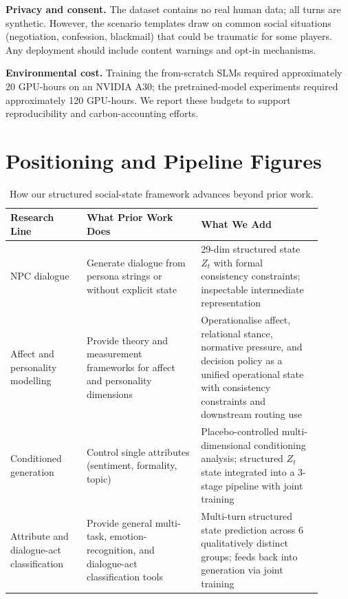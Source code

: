 \documentclass[11pt]{article}
\begin{document}
\textbf{Privacy and consent.} The dataset contains no real human data; all turns are synthetic.
However, the scenario templates draw on common social situations (negotiation, confession, blackmail) that could be traumatic for some players.
Any deployment should include content warnings and opt-in mechanisms.

\textbf{Environmental cost.} Training the from-scratch SLMs required approximately 20 GPU-hours on an NVIDIA A30; the pretrained-model experiments required approximately 120 GPU-hours.
We report these budgets to support reproducibility and carbon-accounting efforts.



\appendix

\section{Positioning and Pipeline Figures}
\label{app:positioning}

\begin{table}[tp]
\centering
\caption{How our structured social-state framework advances beyond prior work.}
\label{tab:novelty}
\footnotesize\setlength{\tabcolsep}{2pt}
\begin{tabular}{@{}p{0.22\linewidth}p{0.33\linewidth}p{0.35\linewidth}@{}}
\toprule
\textbf{Research Line} & \textbf{What Prior Work Does} & \textbf{What We Add} \\
\midrule
NPC dialogue~\cite{park2023generative,wang2023voyager,urbanek2019learning}
    & Generate dialogue from persona strings or without explicit state
    & 29-dim structured state $Z_t$ with formal consistency constraints; inspectable intermediate representation \\
\midrule
Affect and personality modelling~\cite{oatley1987towards,russell1980circumplex,digman1990personality}
    & Provide theory and measurement frameworks for affect and personality dimensions
    & Operationalise affect, relational stance, normative pressure, and decision policy as a unified operational state with consistency constraints and downstream routing use \\
\midrule
Conditioned generation~\cite{li2021prefix,keskar2019ctrl,dathathri2020plug}
    & Control single attributes (sentiment, formality, topic)
    & Placebo-controlled multi-dimensional conditioning analysis; structured $Z_t$ state integrated into a 3-stage pipeline with joint training \\
\midrule
Attribute and dialogue-act classification~\cite{liu2019multi,li2021past,raheja2019dialogue}
    & Provide general multi-task, emotion-recognition, and dialogue-act classification tools
    & Multi-turn structured state prediction across 6 qualitatively distinct groups; feeds back into generation via joint training \\
\bottomrule
\end{tabular}
\end{table}
\end{document}
